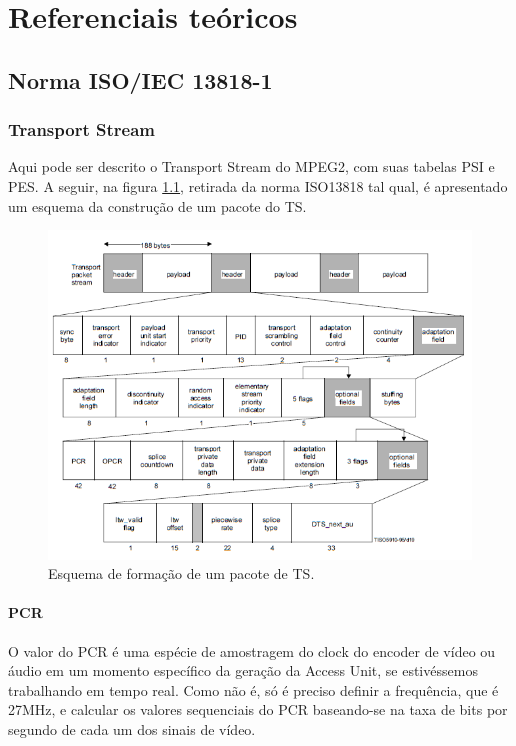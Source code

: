 \documentclass[
	12pt,				%
	openright,			%
	twoside,			%
	a4paper,			%
	english,			%
	french,				%
	brazil				%
	]{abntex2}
\begin{document}
\part{Referenciais teóricos}

\chapter{Norma ISO/IEC 13818-1}

\section{Transport Stream}

Aqui pode ser descrito o Transport Stream do MPEG2, com suas tabelas PSI e PES. A seguir, na figura
\ref{fig:TS_iso13818}, retirada da norma ISO13818 tal qual, é apresentado um esquema da construção de
um pacote do TS.

\begin{figure}
\centering
\includegraphics[width=0.6\linewidth]{figuras/TS_iso13818.png}
\caption{Esquema de formação de um pacote de TS.}
\label{fig:TS_iso13818}
\end{figure}


\subsection{PCR}
O valor do PCR é uma espécie de amostragem do clock do encoder de vídeo ou áudio em um momento específico
da geração da Access Unit, se estivéssemos trabalhando em tempo real. Como não é, só é preciso definir
a frequência, que é 27MHz, e calcular os valores sequenciais do PCR baseando-se na taxa de bits por
segundo de cada um dos sinais de vídeo.
\end{document}
